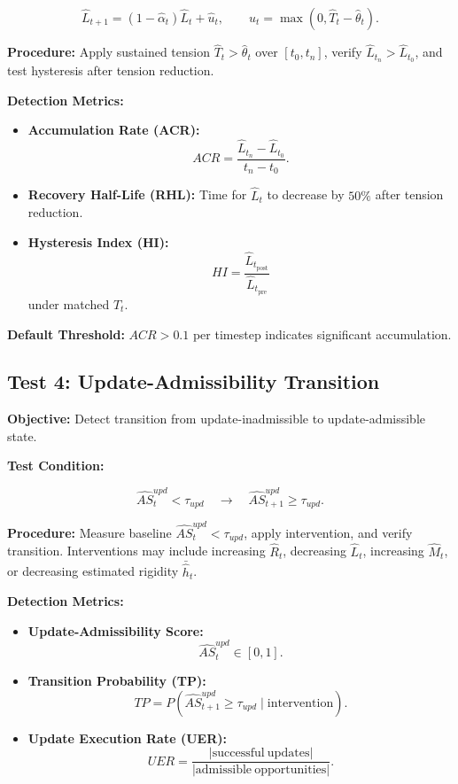 \documentclass[11pt,a4paper]{article}
\theoremstyle{breakstyle}
\newcommand{\That}{\widehat{T}}
\newcommand{\Lhat}{\widehat{L}}
\newcommand{\Rhat}{\widehat{R}}
\newcommand{\Mhat}{\widehat{M}}
\newcommand{\thetahat}{\widehat{\theta}}
\newcommand{\alphahat}{\widehat{\alpha}}
\newcommand{\uhat}{\widehat{u}}
\begin{document}
	\[
	\Lhat_{t+1}
	=
	(1-\alphahat_t)\Lhat_t + \uhat_t,
	\qquad
	\uhat_t = \max(0,\That_t - \thetahat_t).
	\]
	
	\textbf{Procedure:} Apply sustained tension $\That_t > \thetahat_t$ over $[t_0,t_n]$, verify $\Lhat_{t_n} > \Lhat_{t_0}$, and test hysteresis after tension reduction.
	
	\textbf{Detection Metrics:}
	\begin{itemize}
		\item \textbf{Accumulation Rate (ACR):}
		\[
		ACR =
		\frac{\Lhat_{t_n} - \Lhat_{t_0}}{t_n - t_0}.
		\]
		
		\item \textbf{Recovery Half-Life (RHL):} Time for $\Lhat_t$ to decrease by $50\%$ after tension reduction.
		
		\item \textbf{Hysteresis Index (HI):}
		\[
		HI =
		\frac{\Lhat_{t_{\mathrm{post}}}}{\Lhat_{t_{\mathrm{pre}}}}
		\]
		under matched $\That_t$.
	\end{itemize}
	
	\textbf{Default Threshold:} $ACR > 0.1$ per timestep indicates significant accumulation.
	
	\subsection*{Test 4: Update-Admissibility Transition}
	
	\textbf{Objective:} Detect transition from update-inadmissible to update-admissible state.
	
	\textbf{Test Condition:}
	
	\[
	\widehat{AS}^{upd}_{t} < \tau_{upd}
	\quad \rightarrow \quad
	\widehat{AS}^{upd}_{t+1} \geq \tau_{upd}.
	\]
	
	\textbf{Procedure:} Measure baseline $\widehat{AS}^{upd}_t < \tau_{upd}$, apply intervention, and verify transition. Interventions may include increasing $\Rhat_t$, decreasing $\Lhat_t$, increasing $\Mhat_t$, or decreasing estimated rigidity $\bar{\hat{h}}_t$.
	
	\textbf{Detection Metrics:}
	\begin{itemize}
		\item \textbf{Update-Admissibility Score:}
		\[
		\widehat{AS}^{upd}_t \in [0,1].
		\]
		
		\item \textbf{Transition Probability (TP):}
		\[
		TP =
		P(\widehat{AS}^{upd}_{t+1} \geq \tau_{upd}
		\mid
		\mathrm{intervention}).
		\]
		
		\item \textbf{Update Execution Rate (UER):}
		\[
		UER =
		\frac{
			|\mathrm{successful\ updates}|
		}{
			|\mathrm{admissible\ opportunities}|
		}.
		\]
	\end{itemize}
	
\end{document}
